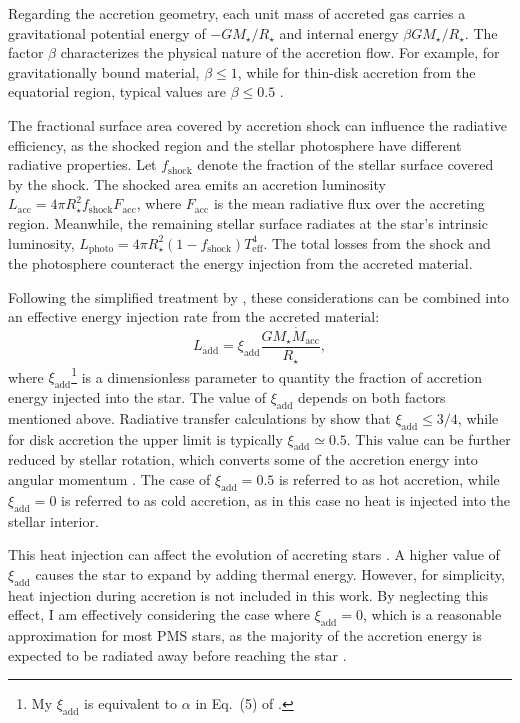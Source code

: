\documentclass[12pt,a4paper]{article}
\newcommand{\mr}{\mathrm}
\begin{document}
Regarding the accretion geometry, each unit mass of accreted gas carries a gravitational potential energy of $-GM_\star/R_\star$ and internal energy $\beta GM_\star/R_\star$. The factor $\beta$ characterizes the physical nature of the accretion flow. For example, for gravitationally bound material, $\beta \leq 1$, while for thin-disk accretion from the equatorial region, typical values are $\beta \leq 0.5$ \parencite{PrialnikLivio1985,HartmannEtAl1998}.

The fractional surface area covered by accretion shock can influence the radiative efficiency, as the shocked region and the stellar photosphere have different radiative properties. Let $f_\mr{shock}$ denote the fraction of the stellar surface covered by the shock. The shocked area emits an accretion luminosity $L_\mr{acc} = 4\pi R_\star^2 f_\mr{shock} F_\mr{acc}$, where $F_\mr{acc}$ is the mean radiative flux over the accreting region. Meanwhile, the remaining stellar surface radiates at the star's intrinsic luminosity, $L_\mr{photo} = 4 \pi R_\star^2 (1 - f_\mr{shock}) T_\mr{eff}^4$. The total losses from the shock and the photosphere counteract the energy injection from the accreted material.

Following the simplified treatment by \textcite{HartmannEtAl1998}, these considerations can be combined into an effective energy injection rate from the accreted material:
\begin{equation}
  L_\mr{add} = \xi_\mr{add}\frac{GM_\star \dot{M}_\mr{acc}}{R_\star},
\end{equation}
where $\xi_\mr{add}$\footnote{My $\xi_\mr{add}$ is equivalent to $\alpha$ in Eq.~(5) of \textcite{HartmannEtAl1998}.} is a dimensionless parameter to quantity the fraction of accretion energy injected into the star. The value of $\xi_\mr{add}$ depends on both factors mentioned above. Radiative transfer calculations by \textcite{StahlerEtAl1980} show that $\xi_\mr{add} \leq 3/4$, while for disk accretion the upper limit is typically $\xi_\mr{add} \simeq 0.5$. This value can be further reduced by stellar rotation, which converts some of the accretion energy into angular momentum \parencite{KunitomoEtAl2017}. The case of $\xi_\mr{add} = 0.5$ is referred to as hot accretion, while $\xi_\mr{add} = 0$ is referred to  as cold accretion, as in this case no heat is injected into the stellar interior.

This heat injection can affect the evolution of accreting stars \parencite[e.g., ][]{KunitomoEtAl2017,AmardMatt2023}. A higher value of $\xi_\mathrm{add}$ causes the star to expand by adding thermal energy. However, for simplicity, heat injection during accretion is not included in this work. By neglecting this effect, I am effectively considering the case where $\xi_\mr{add} = 0$, which is a reasonable approximation for most PMS stars, as the majority of the accretion energy is expected to be radiated away before reaching the star \parencite{HartmannEtAl1998}.
\end{document}
